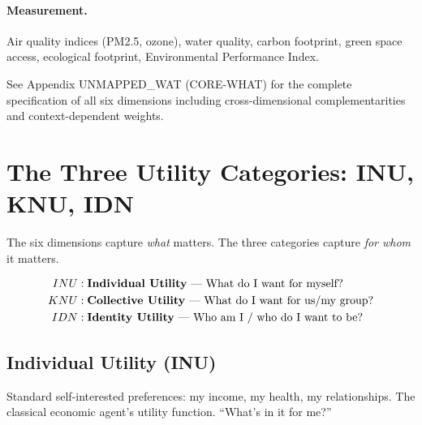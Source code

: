 \paragraph{Measurement.}
Air quality indices (PM2.5, ozone), water quality, carbon footprint,
green space access, ecological footprint, Environmental Performance Index.

\begin{cross-reference}
See Appendix UNMAPPED_WAT (CORE-WHAT) for the complete specification of all six dimensions
including cross-dimensional complementarities and context-dependent weights.
\end{cross-reference}



\section{The Three Utility Categories: INU, KNU, IDN}
\label{sec:fepsde-categories}


The six dimensions capture \emph{what} matters.
The three categories capture \emph{for whom} it matters.

\begin{definition}
\label{def:utility-categories}
\begin{align}
  INU &: \text{\textbf{Individual Utility} --- What do I want for myself?} \\
  KNU &: \text{\textbf{Collective Utility} --- What do I want for us/my group?} \\
  IDN &: \text{\textbf{Identity Utility} --- Who am I / who do I want to be?}
\end{align}
\end{definition}

\subsection{Individual Utility (INU)}
\label{sec:fepsde-inu}

\begin{definition}
Standard self-interested preferences: my income, my health, my relationships.
The classical economic agent's utility function. ``What's in it for me?''
\end{definition}

